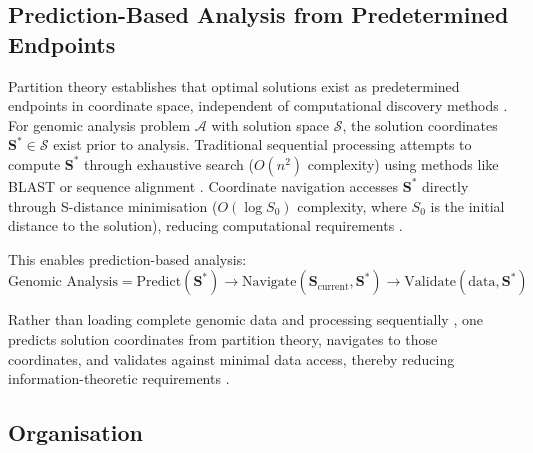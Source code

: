 \documentclass[11pt,a4paper]{article}
\theoremstyle{remark}
\newcommand{\Scoord}{\mathbf{S}}
\begin{document}
\subsection{Prediction-Based Analysis from Predetermined Endpoints}

Partition theory establishes that optimal solutions exist as predetermined endpoints in coordinate space, independent of computational discovery methods \citep{poincare1890probleme, Sachikonye2025_Poincare}. For genomic analysis problem $\mathcal{A}$ with solution space $\mathcal{S}$, the solution coordinates $\Scoord^* \in \mathcal{S}$ exist prior to analysis. Traditional sequential processing attempts to compute $\Scoord^*$ through exhaustive search ($O(n^2)$ complexity) using methods like BLAST or sequence alignment \citep{altschul1990basic, needleman1970general, smith1981identification}. Coordinate navigation accesses $\Scoord^*$ directly through S-distance minimisation ($O(\log S_0)$ complexity, where $S_0$ is the initial distance to the solution), reducing computational requirements \citep{landauer1961irreversibility}.

This enables prediction-based analysis:
\begin{equation}
\text{Genomic Analysis} = \text{Predict}(\Scoord^*) \to \text{Navigate}(\Scoord_{\text{current}}, \Scoord^*) \to \text{Validate}(\text{data}, \Scoord^*)
\end{equation}

Rather than loading complete genomic data and processing sequentially \citep{altschul1990basic, gusfield1997algorithms}, one predicts solution coordinates from partition theory, navigates to those coordinates, and validates against minimal data access, thereby reducing information-theoretic requirements \citep{shannon1948mathematical, landauer1961irreversibility}.

\subsection{Organisation}
\end{document}
